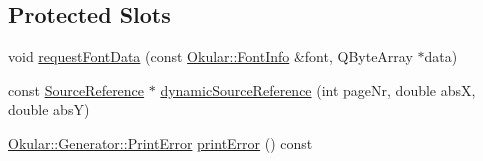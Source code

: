 \subsection*{Protected Slots}
\begin{DoxyCompactItemize}
\item 
void \hyperlink{classOkular_1_1Generator_a21f966f6f1b995e7e1b9ae9ff64a0d5b}{request\+Font\+Data} (const \hyperlink{classOkular_1_1FontInfo}{Okular\+::\+Font\+Info} \&font, Q\+Byte\+Array $\ast$data)
\item 
const \hyperlink{classOkular_1_1SourceReference}{Source\+Reference} $\ast$ \hyperlink{classOkular_1_1Generator_a53841db6ab6c5700ba08d2387d20537b}{dynamic\+Source\+Reference} (int page\+Nr, double abs\+X, double abs\+Y)
\item 
\hyperlink{classOkular_1_1Generator_a43266d4eb3e7929924dd10ea53bc1d61}{Okular\+::\+Generator\+::\+Print\+Error} \hyperlink{classOkular_1_1Generator_a99ee1f166c0735537b5a9ce7191fcfbd}{print\+Error} () const 
\end{DoxyCompactItemize}
